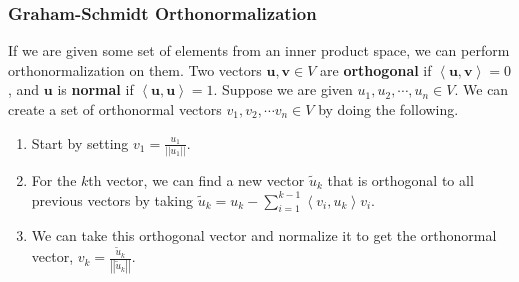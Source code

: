 \documentclass[10pt]{beamer}
\begin{document}
\begin{frame}
  \frametitle{Graham-Schmidt Orthonormalization}
  If we are given some set of elements from an inner product space, we can perform orthonormalization on them. Two vectors $\mathbf{u}, \mathbf{v}\in V$ are \textbf{orthogonal} if $\left<\mathbf{u}, \mathbf{v}\right> = 0$, and $\mathbf{u}$ is \textbf{normal} if $\left<\mathbf{u}, \mathbf{u}\right> = 1$. Suppose we are given $u_1, u_2, \cdots, u_n \in V$. We can create a set of orthonormal vectors $v_1, v_2, \cdots v_n \in V$ by doing the following.
  \begin{enumerate}
  \item Start by setting $v_1 = \frac{u_1}{\left|\left|u_1\right|\right|}$.
  \item For the $k$th vector, we can find a new vector $\tilde{u}_k$ that is orthogonal to all previous vectors by taking $\tilde{u}_k = u_k - \sum_{i = 1}^{k - 1}\left<v_i, u_k\right> v_i$.
  \item We can take this orthogonal vector and normalize it to get the orthonormal vector, $v_k = \frac{\tilde{u}_k}{\left|\left|\tilde{u}_k\right|\right|}$.
  \end{enumerate}
\end{frame}
\end{document}
